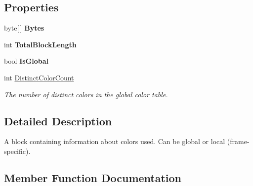 \subsection*{Properties}
\begin{DoxyCompactItemize}
\item 
byte\mbox{[}$\,$\mbox{]} {\bfseries Bytes}\hypertarget{classvcvj_1_1_models_1_1_grammatical___subcomponents_1_1_color_table_abffe3be6aacd8aeeae897f74b1c3ac42}{}\label{classvcvj_1_1_models_1_1_grammatical___subcomponents_1_1_color_table_abffe3be6aacd8aeeae897f74b1c3ac42}

\item 
int {\bfseries Total\+Block\+Length}\hypertarget{classvcvj_1_1_models_1_1_grammatical___subcomponents_1_1_color_table_a163f119d41d8eff30662a588bfe4719f}{}\label{classvcvj_1_1_models_1_1_grammatical___subcomponents_1_1_color_table_a163f119d41d8eff30662a588bfe4719f}

\item 
bool {\bfseries Is\+Global}\hypertarget{classvcvj_1_1_models_1_1_grammatical___subcomponents_1_1_color_table_a85b7df61639b14b1d04379bf46756cff}{}\label{classvcvj_1_1_models_1_1_grammatical___subcomponents_1_1_color_table_a85b7df61639b14b1d04379bf46756cff}

\item 
int \hyperlink{classvcvj_1_1_models_1_1_grammatical___subcomponents_1_1_color_table_acdf650955484bc8e7b75518c5369939e}{Distinct\+Color\+Count}
\begin{DoxyCompactList}\small\item\em The number of distinct colors in the global color table. \end{DoxyCompactList}\end{DoxyCompactItemize}


\subsection{Detailed Description}
A block containing information about colors used. Can be global or local (frame-\/specific). 



\subsection{Member Function Documentation}
